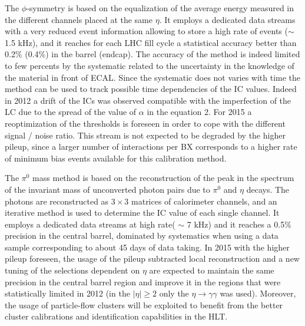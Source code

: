 \documentclass[journal]{IEEEtran}
\begin{document}
The $\phi$-symmetry is based on the equalization of the average energy measured in the different channels placed at the same $\eta$. It employs a dedicated data streams with a very reduced event information allowing to store a high rate of events ($\sim$ 1.5 kHz), and it reaches for each LHC fill cycle a statistical accuracy better than 0.2\% (0.4\%) in the barrel (endcap). The accuracy of the method is indeed limited to few percents by the systematic related to the uncertainty in the knowledge of the material in front of ECAL. Since the systematic does not varies with time the method can be used to track possible time dependencies of the IC values. Indeed in 2012 a drift of the ICs was observed compatible with the imperfection of the LC due to the spread of the value of $\alpha$ in the equation 2. For 2015 a reoptimization of the thresholds is foreseen in order to cope with the different signal / noise ratio. This stream is not expected to be degraded by the higher pileup, since a larger number of interactions per BX corresponds to a higher rate of minimum bias events available for this calibration method.

The $\pi^0$ mass method is based on the reconstruction of the peak in the spectrum of the invariant mass of unconverted photon pairs due to $\pi^0$ and $\eta$ decays. The photons are reconstructed as $3 \times 3$ matrices of calorimeter channels, and an iterative method is used to determine the IC value of each single channel. It employs a dedicated data streams at high rate( $\sim$ 7 kHz) and it reaches a 0.5\% precision in the central barrel, dominated by systematics when using a data sample corresponding to about 45 days of data taking. In 2015 with the higher pileup foreseen, the usage of the pileup subtracted local reconstruction and a new tuning of the selections dependent on $\eta$ are expected to maintain the same precision in the central barrel region and improve it in the regions that were statistically limited in 2012 (in the $\vert\eta\vert\ge2$ only the $\eta\to\gamma\gamma$ was used). Moreover, the usage of particle-flow clusters \cite{CMS:2010eua} will be exploited to benefit from the better cluster calibrations and identification capabilities in the HLT.
\end{document}
